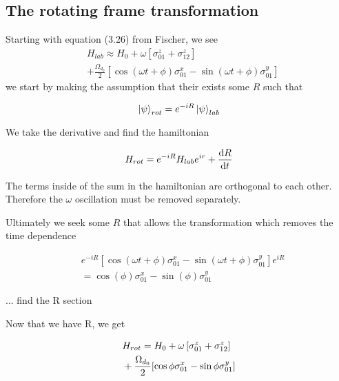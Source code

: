 \documentclass[12pt]{article}
\begin{document}
\subsection{The rotating frame transformation}

Starting with equation (3.26) from Fischer, we see 
\begin{equation}\label{eq:post_r_ham}
\begin{split}
        & H_{lab} \approx H_0 + \omega \left[\sigma^z_{01} + \sigma^z_{12}\right] \\ 
        & + \frac{\Omega_{d_0}}{2} \left[ \cos(\omega t + \phi)\sigma^x_{01} - \sin(\omega t + \phi)\sigma^y_{01} \right]
\end{split}
\end{equation}
we start by making the assumption that their exists some $R$ such that

\begin{equation}
        \ket{\psi}_{rot} = e^{-iR} \ket{\psi}_{lab}
\end{equation}

We take the derivative and find the hamiltonian 

\begin{equation}
        H_{rot} = e^{-iR} H_{lab} e^{ir} + \derivative{R}{t}
\end{equation}

The terms inside of the sum in the hamiltonian are orthogonal to each other.
Therefore the $\omega$ oscillation must be removed separately.

Ultimately we seek some $R$ that allows the transformation which removes the time dependence 

\begin{equation}
        \begin{split}
                & e^{-i R}\left[ \cos(\omega t + \phi)\sigma^x_{01} - \sin(\omega t + \phi)\sigma^y_{01}\right] e^{iR} \\
                & = \cos{(\phi)} \sigma^x_{01} - \sin{(\phi)} \sigma^y_{01}
        \end{split}
\end{equation}

... find the R section

Now that we have R, we get 

\begin{equation}\label{eq:rotating_frame_ham}
        \begin{split}
        & H_{rot} = H_0 + \omega \left[\sigma^z_{01} + \sigma^z_{12}\right] \\
        & + \frac{\Omega_{d_0}}{2} \qty[\cos{\phi} \sigma^x_{01} - \sin{\phi} \sigma^y_{01}]
        \end{split}
\end{equation}
\end{document}
